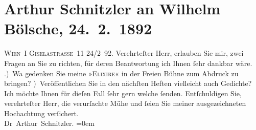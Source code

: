 

         
         \newcommand{\erwaehntePersonen}{Personen: Wilhelm Bölsche}
         \newcommand{\erwaehnteInstitutionen}{}
         \newcommand{\erwaehnteOrte}{Orte: Berlin, Bösendorferstraße, Wien}
         \newcommand{\erwaehnteWerke}{Werke: Die drei Elixire, Freie Bühne für den Entwickelungskampf der Zeit}
               \section[Arthur Schnitzler an Wilhelm Bölsche, 24. 2. 1892]{ Arthur Schnitzler an Wilhelm Bölsche, 24. 2. 1892}\nopagebreak{}\rehead{ }\begin{ledgroupsized}[t]{13cm}\normalsize\beginnumbering \toendnotes[C]{\smallbreak\pagebreak[2]} 
\pstart
           \noindent{}{\pb}\textsc{Wien I Giselastraße 11}\pend
           \pstart
           \raggedleft{}24/2 92.\pend
           \pstart{}Verehrteſter Herr,\pend\pstart
           erlauben Sie mir, zwei Fragen an Sie zu richten, für deren Beantwortung ich Ihnen
                    ſehr dankbar wäre.\pend
           .) Wa{\geminationn} gedenken Sie meine »\textsc{Elixire}« in der Freien Bühne zum Abdruck zu
                    bringen?\pend
           ) Veröffentlichen Sie in den nächſten Heften vielleicht auch Gedichte? Ich
                    möchte {\pb}Ihnen für dieſen Fall ſehr gern welche
                    ſenden.\pend
           \pstart
           Entſchuldigen Sie, verehrteſter Herr, die verurſachte Mühe und ſeien Sie
                    meiner ausgezeichneten Hochachtung verſichert.{\\[\baselineskip]}\spacefill\mbox{Dr Arthur Schnitzler.}\pend
           \leftskip=0em{}
         
         \endnumbering{}\end{ledgroupsized}  \newcommand{\dateiname}{L00076}\newcommand{\titel}{Arthur Schnitzler an Wilhelm Bölsche, 24. 2. 1892}\newcommand{\editorInnen}{Martin Anton Müller und Gerd-Hermann Susen}
      